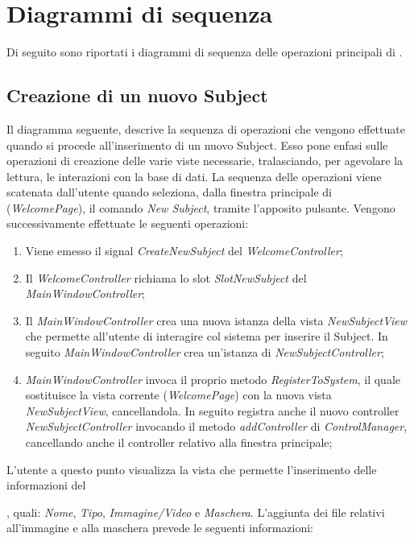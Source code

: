 \section{Diagrammi di sequenza}
\label{diagrammi_seq}

Di seguito sono riportati i diagrammi di sequenza delle operazioni principali di \project{}.

\subsection{Creazione di un nuovo Subject}
\label{creazione_subject}
Il diagramma seguente, descrive la sequenza di operazioni che vengono effettuate quando si procede all'inserimento di un nuovo Subject\g{}. Esso pone enfasi sulle operazioni di creazione delle varie viste necessarie, tralasciando, per agevolare la lettura, le interazioni con la base di dati.
 La sequenza delle operazioni viene scatenata dall'utente quando seleziona, dalla finestra principale di \project{} (\textit{WelcomePage}), il comando \textit{New Subject}, tramite l'apposito pulsante. Vengono successivamente effettuate le seguenti operazioni:
\begin{enumerate}
	\item Viene emesso il signal\g{} \textit{CreateNewSubject} del \textit{WelcomeController};
	\item Il \textit{WelcomeController} richiama lo slot\g{} \textit{SlotNewSubject} del \textit{MainWindowController};
	\item Il \textit{MainWindowController} crea una nuova istanza della vista \textit{NewSubjectView} che permette all'utente di interagire col sistema per inserire il Subject\g{}. In seguito \textit{MainWindowController} crea un'istanza di \textit{NewSubjectController};
	\item \textit{MainWindowController} invoca il proprio metodo \textit{RegisterToSystem}, il quale sostituisce la vista corrente (\textit{WelcomePage}) con la nuova vista \textit{NewSubjectView}, cancellandola. In seguito registra anche il nuovo controller \textit{NewSubjectController} invocando il metodo \textit{addController} di \textit{ControlManager}, cancellando anche il controller relativo alla finestra principale;
\end{enumerate}
L'utente a questo punto visualizza la vista che permette l'inserimento delle informazioni del \subject{}, quali: \textit{Nome}, \textit{Tipo}, \textit{Immagine/Video} e \textit{Maschera}. L'aggiunta dei file relativi all'immagine e alla maschera prevede le seguenti informazioni:
